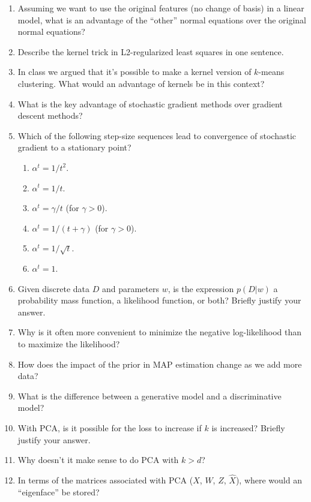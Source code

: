 \documentclass{article}
\def\enum#1{\begin{enumerate}#1\end{enumerate}}
\begin{document}
\enum{
\item Assuming we want to use the original features (no change of basis) in a linear model, what is an advantage of the ``other'' normal equations over the original normal equations?
\item Describe the kernel trick in L2-regularized least squares in one sentence.
\item In class we argued that it's possible to make a kernel version of $k$-means clustering. What would an advantage of kernels be in this context?
\item What is the key advantage of stochastic gradient methods over gradient descent methods?
\item Which of the following step-size sequences lead to convergence of stochastic gradient to a stationary point?
\enum{
\item $\alpha^t = 1/t^2$.
\item $\alpha^t = 1/t$.
\item $\alpha^t = \gamma/t$ (for $\gamma > 0$).
\item $\alpha^t = 1/(t+\gamma)$ (for $\gamma > 0$).
\item $\alpha^t = 1/\sqrt{t}$.
\item $\alpha^t = 1$.
}
\item{Given discrete data $D$ and parameters $w$, is the expression $p(D|w)$ a probability mass function, a likelihood function, or both? Briefly justify your answer.}
\item{Why is it often more convenient to minimize the negative log-likelihood than to maximize the likelihood?}
\item How does the impact of the prior in MAP estimation change as we add more data?
\item What is the difference between a generative model and a discriminative model?
\item With PCA, is it possible for the loss to increase if $k$ is increased? Briefly justify your answer.
\item Why doesn't it make sense to do PCA with $k > d$?
\item In terms of the matrices associated with PCA ($X$, $W$, $Z$, $\hat{X}$), where would an ``eigenface'' be stored?
}
\end{document}
